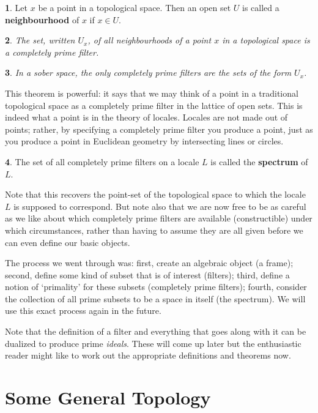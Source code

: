 \documentclass[oneside,english]{amsbook}
\numberwithin{section}{chapter}
\theoremstyle{plain}
\newtheorem{thm}{\protect\theoremname}
\theoremstyle{definition}
\newtheorem{defn}[thm]{\protect\definitionname}
\providecommand{\definitionname}{Definition}
\providecommand{\theoremname}{Theorem}
\begin{document}
\begin{defn}
	Let $x$ be a point in a topological space. Then an open set $U$ is called a \textbf{neighbourhood} of $x$ if $x\in U$.\end{defn}

\begin{thm}
	The set, written $U_x$, of all neighbourhoods of a point $x$ in a topological space is a completely prime filter.
\end{thm}

\begin{thm}
	In a sober space, the only completely prime filters are the sets of the form $U_x$.
\end{thm}

This theorem is powerful: it says that we may think of a point in a traditional topological space as a completely prime filter in the lattice of open sets. This is indeed what a point is in the theory of locales. Locales are not made out of points; rather, by specifying a completely prime filter you produce a point, just as you produce a point in Euclidean geometry by intersecting lines or circles.

\begin{defn}
	The set of all completely prime filters on a locale $L$ is called the \textbf{spectrum} of $L$.
\end{defn}

Note that this recovers the point-set of the topological space to which the locale $L$ is supposed to correspond. But note also that we are now free to be as careful as we like about which completely prime filters are available (constructible) under which circumstances, rather than having to assume they are all given before we can even define our basic objects.

The process we went through was: first, create an algebraic object (a frame); second, define some kind of subset that is of interest (filters); third, define a notion of `primality' for these subsets (completely prime filters); fourth, consider the collection of all prime subsets to be a space in itself (the spectrum). We will use this exact process again in the future.

Note that the definition of a filter and everything that goes along with it can be dualized to produce prime \emph{ideals}. These will come up later but the enthusiastic reader might like to work out the appropriate definitions and theorems now.

\section{Some General Topology}
\end{document}
